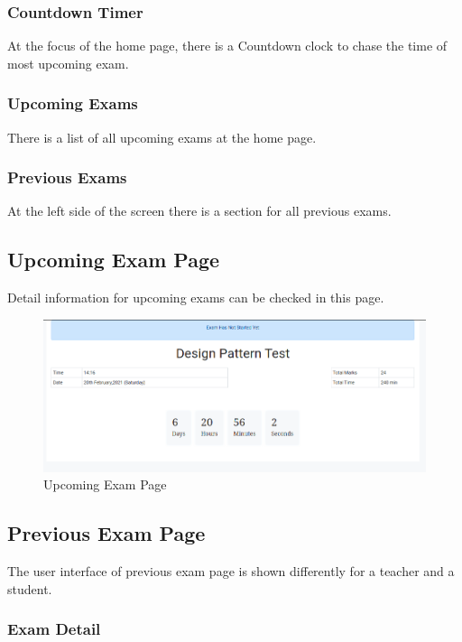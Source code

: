 \documentclass[10pt]{article}
\begin{document}
\subsubsection{Countdown Timer}

At the focus of the home page, there is a Countdown clock to chase the time of most upcoming exam.

\subsubsection{Upcoming Exams}
There is a list of all upcoming exams at the home page.

\subsubsection{Previous Exams}
At the left side of the screen there is a section for all previous exams.

\subsection{Upcoming Exam Page}
Detail information for upcoming exams can be checked in this page.

\begin{figure}[H]
  \centering
  \centerline{\includegraphics[width=\textwidth]{studnt/upcoming-exam.png}}
  \caption{Upcoming Exam Page}
  \label{fig}
\end{figure}

\subsection{Previous Exam Page}

The user interface of previous exam page is shown differently for a teacher and a student.

\subsubsection{Exam Detail}
\end{document}
